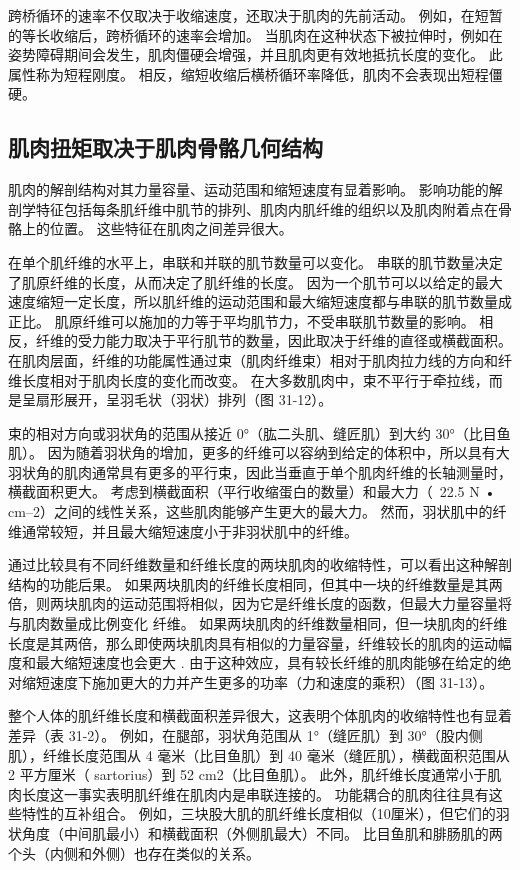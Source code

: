 跨桥循环的速率不仅取决于收缩速度，还取决于肌肉的先前活动。 例如，在短暂的等长收缩后，跨桥循环的速率会增加。 当肌肉在这种状态下被拉伸时，例如在姿势障碍期间会发生，肌肉僵硬会增强，并且肌肉更有效地抵抗长度的变化。 此属性称为短程刚度。 相反，缩短收缩后横桥循环率降低，肌肉不会表现出短程僵硬。

\subsection{肌肉扭矩取决于肌肉骨骼几何结构}
肌肉的解剖结构对其力量容量、运动范围和缩短速度有显着影响。 影响功能的解剖学特征包括每条肌纤维中肌节的排列、肌肉内肌纤维的组织以及肌肉附着点在骨骼上的位置。 这些特征在肌肉之间差异很大。

在单个肌纤维的水平上，串联和并联的肌节数量可以变化。 串联的肌节数量决定了肌原纤维的长度，从而决定了肌纤维的长度。 因为一个肌节可以以给定的最大速度缩短一定长度，所以肌纤维的运动范围和最大缩短速度都与串联的肌节数量成正比。 肌原纤维可以施加的力等于平均肌节力，不受串联肌节数量的影响。 相反，纤维的受力能力取决于平行肌节的数量，因此取决于纤维的直径或横截面积。 在肌肉层面，纤维的功能属性通过束（肌肉纤维束）相对于肌肉拉力线的方向和纤维长度相对于肌肉长度的变化而改变。 在大多数肌肉中，束不平行于牵拉线，而是呈扇形展开，呈羽毛状（羽状）排列（图 31-12）。

束的相对方向或羽状角的范围从接近 0°（肱二头肌、缝匠肌）到大约 30°（比目鱼肌）。 因为随着羽状角的增加，更多的纤维可以容纳到给定的体积中，所以具有大羽状角的肌肉通常具有更多的平行束，因此当垂直于单个肌肉纤维的长轴测量时，横截面积更大。 考虑到横截面积（平行收缩蛋白的数量）和最大力（~22.5 N • cm–2）之间的线性关系，这些肌肉能够产生更大的最大力。 然而，羽状肌中的纤维通常较短，并且最大缩短速度小于非羽状肌中的纤维。

通过比较具有不同纤维数量和纤维长度的两块肌肉的收缩特性，可以看出这种解剖结构的功能后果。 如果两块肌肉的纤维长度相同，但其中一块的纤维数量是其两倍，则两块肌肉的运动范围将相似，因为它是纤维长度的函数，但最大力量容量将与肌肉数量成比例变化 纤维。 如果两块肌肉的纤维数量相同，但一块肌肉的纤维长度是其两倍，那么即使两块肌肉具有相似的力量容量，纤维较长的肌肉的运动幅度和最大缩短速度也会更大 . 由于这种效应，具有较长纤维的肌肉能够在给定的绝对缩短速度下施加更大的力并产生更多的功率（力和速度的乘积）（图 31-13）。

整个人体的肌纤维长度和横截面积差异很大，这表明个体肌肉的收缩特性也有显着差异（表 31-2）。 例如，在腿部，羽状角范围从 1°（缝匠肌）到 30°（股内侧肌），纤维长度范围从 4 毫米（比目鱼肌）到 40 毫米（缝匠肌），横截面积范围从 2 平方厘米（ sartorius）到 52 cm2（比目鱼肌）。 此外，肌纤维长度通常小于肌肉长度这一事实表明肌纤维在肌肉内是串联连接的。 功能耦合的肌肉往往具有这些特性的互补组合。 例如，三块股大肌的肌纤维长度相似（10厘米），但它们的羽状角度（中间肌最小）和横截面积（外侧肌最大）不同。 比目鱼肌和腓肠肌的两个头（内侧和外侧）也存在类似的关系。

